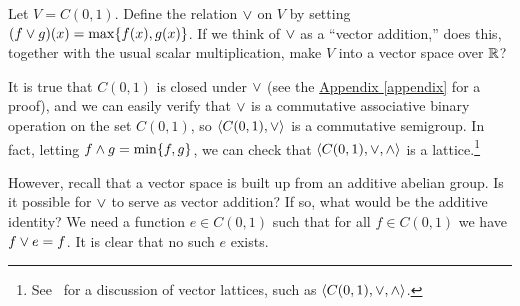 \begin{problem}[Golan 60]\hskip-2mm\protect\footnotemark
\label{prob:2}
\renewcommand\boxplus{\ensuremath{\join}}
Let $V = C(0,1)$. Define the relation $\boxplus$ on $V$ by setting 
$(f \boxplus g)(x)= \max \{f(x), g(x)\}$.  
If we think of $\boxplus$ as a ``vector addition,'' does this, together with the
usual scalar multiplication, make $V$ into a vector space over $\mathbb{R}$?

\end{problem}
\smallskip
\begin{solution}
It is true that $C(0,1)$ is closed under $\vee$ (see the
\hyperref[appendix]{Appendix \ref*{appendix}} for a
proof), and we can easily verify that $\vee$ is a commutative associative
binary operation on the set $C(0,1)$, so $\langle C(0,1), \vee\rangle$ is a 
commutative semigroup.  In fact, letting  
$f \wedge g = \min\{f, g\}$, we can check that $\langle C(0,1), \vee,
\wedge\rangle$  is a lattice.\footnote{See~\cite[Sec.~30]{Aliprantis:1998} for a
  discussion of vector lattices, such as $\langle C(0,1), \vee, \wedge\rangle$.}

However, recall that a vector space is built up from an additive abelian group.
Is it possible for $\vee$ to serve as vector addition?  If so, what would be
the additive identity?  We need a function $e \in C(0,1)$ such that for all $f
\in C(0,1)$ we have $f \vee e = f$.  It is clear that no such $e$ exists.

\end{solution}
\probskip



